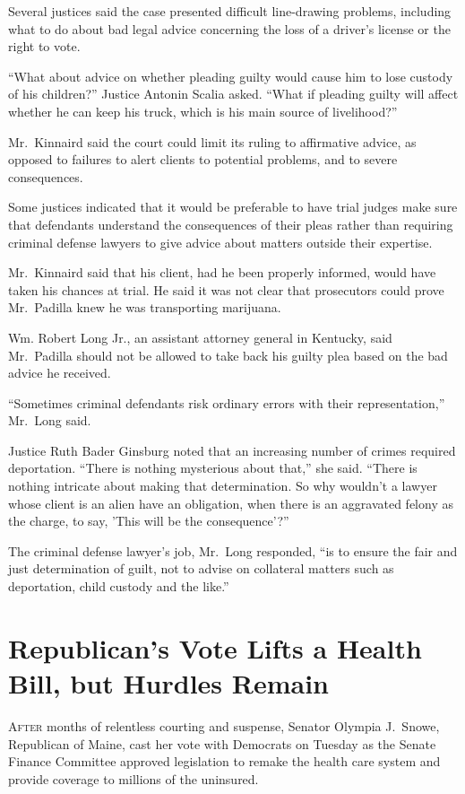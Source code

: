 ﻿\documentclass[12pt]{article}
\begin{document}
Several justices said the case presented difficult line-drawing problems, including what to do about
bad legal advice concerning the loss of a driver's license or the right to vote.

``What about advice on whether pleading guilty would cause him to lose custody of his children?''
Justice Antonin Scalia asked. ``What if pleading guilty will affect whether he can keep his truck,
which is his main source of livelihood?''

Mr.~Kinnaird said the court could limit its ruling to affirmative advice, as opposed to failures to
alert clients to potential problems, and to severe consequences.

Some justices indicated that it would be preferable to have trial judges make sure that defendants
understand the consequences of their pleas rather than requiring criminal defense lawyers to give
advice about matters outside their expertise.

Mr.~Kinnaird said that his client, had he been properly informed, would have taken his chances at
trial. He said it was not clear that prosecutors could prove Mr.~Padilla knew he was transporting
marijuana.

Wm. Robert Long Jr., an assistant attorney general in Kentucky, said Mr.~Padilla should not be
allowed to take back his guilty plea based on the bad advice he received.

``Sometimes criminal defendants risk ordinary errors with their representation,'' Mr.~Long said.

Justice Ruth Bader Ginsburg noted that an increasing number of crimes required deportation. ``There
is nothing mysterious about that,'' she said. ``There is nothing intricate about making that
determination. So why wouldn't a lawyer whose client is an alien have an obligation, when there is
an aggravated felony as the charge, to say, 'This will be the consequence'?''

The criminal defense lawyer's job, Mr.~Long responded, ``is to ensure the fair and just
determination of guilt, not to advise on collateral matters such as deportation, child custody and
the like.''

\section{Republican's Vote Lifts a Health Bill, but Hurdles Remain}

\lettrine{A}{fter} months of relentless courting and suspense, Senator
Olympia J.~Snowe, Republican of Maine, cast her vote with Democrats on Tuesday as the Senate Finance
Committee approved legislation to remake the health care system and provide coverage to millions of
the uninsured.
\end{document}
